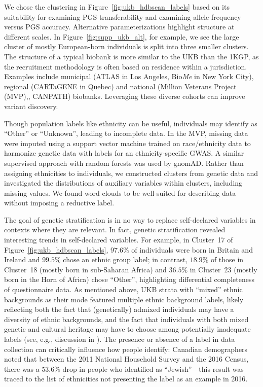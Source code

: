 We chose the clustering in Figure~\ref{fig:ukb_hdbscan_labels} based on its suitability for examining PGS transferability and examining allele frequency versus PGS accuracy. Alternative parameterizations highlight structure at different scales. In Figure~\ref{fig:supp_ukb_alt}, for example, we see the large cluster of mostly European-born individuals is split into three smaller clusters. The structure of a typical biobank is more similar to the UKB than the 1KGP, as the recruitment methodology is often based on residence within a jurisdiction. Examples include municipal (ATLAS in Los Angeles\citep{caggiano_disease_2023}, Bio\emph{Me} in New York City\citep{belbin_toward_2021}), regional (CARTaGENE in Quebec\citep{awadalla_cohort_2013}) and national (Million Veterans Project (MVP),\citep{hunter-zinck_genotyping_2020}, CANPATH\citep{dummer_canadian_2018}) biobanks. Leveraging these diverse cohorts can improve variant discovery\citep{wojcik_genetic_2019,lin_admixed_2021}.

Though population labels like ethnicity can be useful, individuals may identify as ``Other'' or ``Unknown'', leading to incomplete data. In the MVP, missing data were imputed using a support vector machine trained on race/ethnicity data to harmonize genetic data with labels for an ethnicity-specific GWAS\citep{fang_harmonizing_2019}. A similar supervised approach with random forests was used by gnomAD\citep{karczewski_mutational_2020}. Rather than assigning ethnicities to individuals, we constructed clusters from genetic data and investigated the distributions of auxiliary variables within clusters, including missing values. We found word clouds to be well-suited for describing data without imposing a reductive label.   

The goal of genetic stratification is in no way to replace self-declared variables in contexts where they are relevant. In fact, genetic stratification revealed interesting trends in self-declared variables. For example, in Cluster~17 of Figure~\ref{fig:ukb_hdbscan_labels}, $97.6\%$ of individuals were born in Britain and Ireland and $99.5\%$ chose an ethnic group label; in contrast, $18.9\%$ of those in Cluster~18 (mostly born in sub-Saharan Africa) and $36.5\%$ in Cluster~23 (mostly born in the Horn of Africa) chose ``Other'', highlighting differential completeness of questionnaire data. As mentioned above, UKB strata with ``mixed'' ethnic backgrounds as their mode featured multiple ethnic background labels, likely reflecting both the fact that (genetically) admixed individuals may have a diversity of ethnic backgrounds, and the fact that individuals with both mixed genetic and cultural heritage may have to choose among potentially inadequate labels (see, e.g., discussion in \citep{martschenko_including_2023}). The presence or absence of a label in data collection can critically influence how people identify: Canadian demographers noted that between the 2011 National Household Survey and the 2016 Census, there was a $53.6\%$ drop in people who identified as ``Jewish''---this result was traced to the list of ethnicities not presenting the label as an example in 2016\citep{government_of_canada_technical_2019}. 

